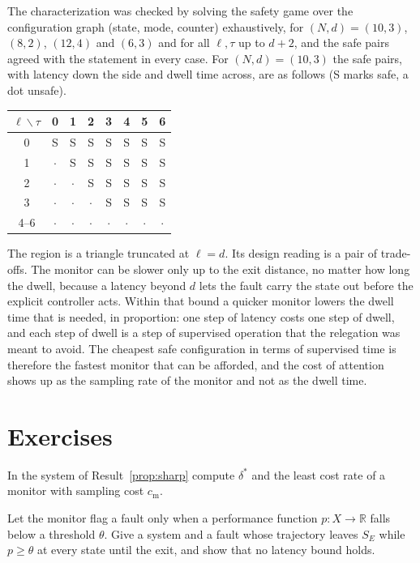 The characterization was checked by solving the safety game over the configuration graph (state, mode, counter) exhaustively, for $(N,d)=(10,3)$, $(8,2)$, $(12,4)$ and $(6,3)$ and for all $\ell,\tau$ up to $d+2$, and the safe pairs agreed with the statement in every case. For $(N,d)=(10,3)$ the safe pairs, with latency down the side and dwell time across, are as follows (S marks safe, a dot unsafe).
\begin{center}
\begin{tabular}{c|ccccccc}
$\ell\backslash\tau$ & 0 & 1 & 2 & 3 & 4 & 5 & 6\\
\hline
0 & S & S & S & S & S & S & S\\
1 & $\cdot$ & S & S & S & S & S & S\\
2 & $\cdot$ & $\cdot$ & S & S & S & S & S\\
3 & $\cdot$ & $\cdot$ & $\cdot$ & S & S & S & S\\
4--6 & $\cdot$ & $\cdot$ & $\cdot$ & $\cdot$ & $\cdot$ & $\cdot$ & $\cdot$\\
\end{tabular}
\end{center}
The region is a triangle truncated at $\ell=d$. Its design reading is a pair of trade-offs. The monitor can be slower only up to the exit distance, no matter how long the dwell, because a latency beyond $d$ lets the fault carry the state out before the explicit controller acts. Within that bound a quicker monitor lowers the dwell time that is needed, in proportion: one step of latency costs one step of dwell, and each step of dwell is a step of supervised operation that the relegation was meant to avoid. The cheapest safe configuration in terms of supervised time is therefore the fastest monitor that can be afforded, and the cost of attention shows up as the sampling rate of the monitor and not as the dwell time.

\section*{Exercises}

\begin{exercise}
In the system of Result~\ref{prop:sharp} compute $\delta^{*}$ and the least cost rate of a monitor with sampling cost $c_{\mathrm m}$.
\end{exercise}

\begin{exercise}\label{ex:conceal}
Let the monitor flag a fault only when a performance function $p:X\to\mathbb R$ falls below a threshold $\theta$. Give a system and a fault whose trajectory leaves $S_E$ while $p\ge\theta$ at every state until the exit, and show that no latency bound holds.
\end{exercise}

